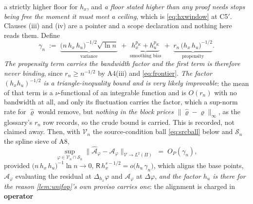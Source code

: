 \begin{lemma}
a strictly higher floor for $h_x$, and \emph{a floor stated higher than any proof needs stops being free the
moment it must meet a ceiling}, which is \eqref{eq:hxwindow} at C5$'$. Clauses (iii) and (iv) are a
pointer and a scope declaration and nothing here reads them. Define
\begin{equation}\label{eq:gamman}
\gamma_n\;:=\;\underbrace{\big(n\,h_x\,h_u\big)^{-1/2}\sqrt{\ln n}}_{\text{variance}}
\;+\;\underbrace{h_x^{p_K}+h_u^{p_K}}_{\text{smoothing bias}}
\;+\;\underbrace{r_n\,\big(h_x\,h_u\big)^{-1/2}}_{\text{propensity}} .
\end{equation}
\emph{The propensity term carries the bandwidth factor and the first term is therefore never binding},
since $r_n\ge n^{-1/2}$ by A4(iii) and \eqref{eq:frontier}. \emph{The factor $(h_xh_u)^{-1/2}$ is a
triangle-inequality bound and is very likely improvable}: the mean of that term is a $\nu$-functional
of an integrable function and is $O(r_n)$ with no bandwidth at all, and only its fluctuation carries
the factor, which a sup-norm rate for $\hat\varrho$ would remove, but \emph{nothing in the block
prices $\|\hat\varrho-\varrho\|_\infty$}, as the glossary's $r_n$ row records, so the crude bound is
carried. This is recorded, not claimed away.
Then, with $\mathcal V_n$ the source-condition ball \eqref{eq:srcball} below and
$\mathcal S_n$ the spline sieve of A8,
\begin{equation}\label{eq:aerr}
\sup_{\varphi\in\mathcal V_n\cap\mathcal S_n}\big\|\hat{\mathcal A}_\varphi-\mathcal A_\varphi\big\|_{\mathcal V\to L^{2}(\Pi)}
\;=\;O_P(\gamma_n),
\end{equation}
provided $\big(n\,h_x\,h_u\big)^{-1}\ln n\to0$, $\mathsf R\,h_x^{s-1/2}=o\big(h_u\,\gamma_n\big)$, 
which aligns the base points, $\hat{\mathcal A}_\varphi$ evaluating the residual at
$\Delta_{h_x}\varphi$ and $\mathcal A_\varphi$ at $\Delta\varphi$, \emph{and the factor $h_u$ is there for
the reason \cref{lem:unifop}'s own proviso carries one}: the alignment is charged in \textbf{operator}

\end{lemma}
